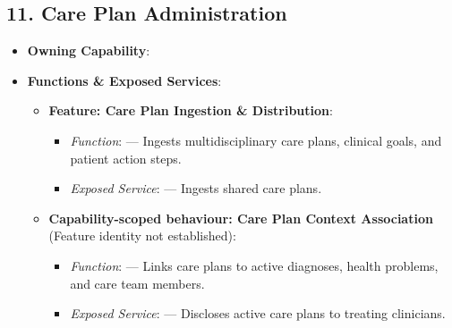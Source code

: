 \par\smallskip
{}\label{rad:sa:182}
\subsection*{11. Care Plan Administration}
\label{rad:sa:183}

\begin{itemize}

\item
\textbf{Owning Capability}: \texttt{}



\item
\textbf{Functions \& Exposed Services}:


\begin{itemize}

\item
\textbf{Feature: Care Plan Ingestion \& Distribution}:


\begin{itemize}

\item
\emph{Function}: \texttt{} — Ingests multidisciplinary care plans, clinical goals, and patient action steps.



\item
\emph{Exposed Service}: \texttt{} — Ingests shared care plans.



\end{itemize}


\item
\textbf{Capability-scoped behaviour: Care Plan Context Association} (Feature identity not established):


\begin{itemize}

\item
\emph{Function}: \texttt{} — Links care plans to active diagnoses, health problems, and care team members.



\item
\emph{Exposed Service}: \texttt{} — Discloses active care plans to treating clinicians.



\end{itemize}



\end{itemize}
\end{itemize}
